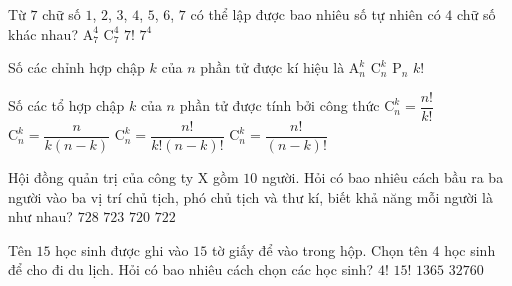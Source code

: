 \begin{ex}%
	 Từ $7$ chữ số $1$, $2$, $3$, $4$, $5$, $6$, $7$ có thể lập được bao nhiêu số tự nhiên có $4$ chữ số khác nhau?
	\choice
	{\True $\mathrm{A}_{7}^4$}
	{$\mathrm{C}_{7}^4$}
	{$7!$}
	{$7^4$}
\end{ex}
\begin{ex}%
 	Số các chỉnh hợp chập $k$ của $n$ phần tử được kí hiệu là
	\choice
	{\True $\mathrm{A}_{n}^k$}
	{$\mathrm{C}_{n}^k$}
	{$\mathrm{P}_n$}
	{$k!$}
\end{ex}
\begin{ex}%
	Số các tổ hợp chập $k$ của $n$ phần tử được tính bởi công thức
	\choice
	{$\mathrm{C}_{n}^k=\dfrac{n!}{k!}$}
	{$\mathrm{C}_{n}^k=\dfrac{n}{k(n-k)}$}
	{\True $\mathrm{C}_{n}^k=\dfrac{n!}{k!(n-k)!}$}
	{$\mathrm{C}_{n}^k=\dfrac{n!}{(n-k)!}$}
\end{ex}
\begin{ex}%
	Hội đồng quản trị của công ty X gồm $10$ người. Hỏi có bao nhiêu cách bầu ra ba người vào ba vị trí chủ tịch, phó chủ tịch và thư kí, biết khả năng mỗi người là như nhau?
	\choice
	{$728$}
	{$723$}
	{\True $720$}
	{$722$}
\end{ex}
\begin{ex}%
	Tên $15$ học sinh được ghi vào $15$ tờ giấy để vào trong hộp. Chọn tên $4$ học sinh để cho đi du lịch.
	Hỏi có bao nhiêu cách chọn các học sinh?
	\choice
	{$4!$}
	{$15!$}
	{\True $1365$}
	{$32760$}
\end{ex}
